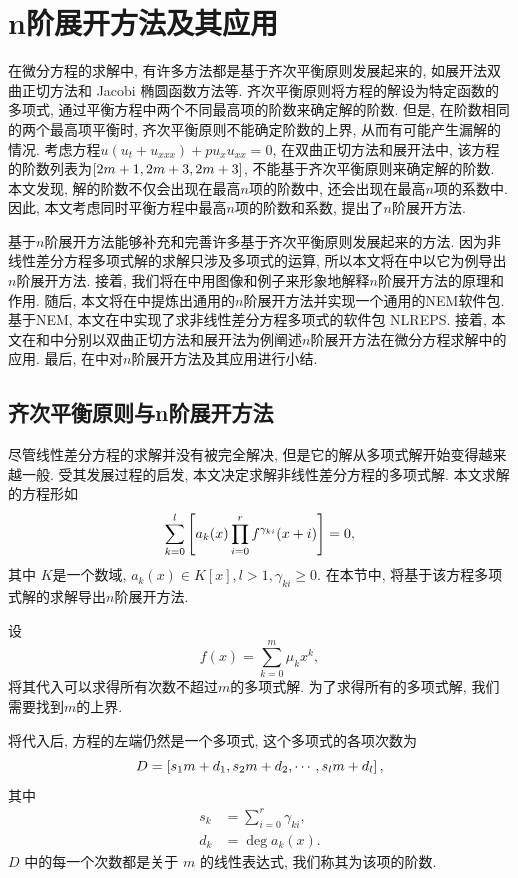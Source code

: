 \chapter{n阶展开方法及其应用}\label{ch04}
在微分方程的求解中, 有许多方法都是基于齐次平衡原则发展起来的, 如\Painleve{}展开法\D 双曲正切方法和 Jacobi 椭圆函数方法等. 齐次平衡原则将方程的解设为特定函数的多项式, 通过平衡方程中两个不同最高项的阶数来确定解的阶数. 但是, 在阶数相同的两个最高项平衡时, 齐次平衡原则不能确定阶数的上界, 从而有可能产生漏解的情况. 考虑方程$u(u_t+u_{xxx})+pu_x u_{xx}=0$, 在双曲正切方法和\Painleve{}展开法中, 该方程的阶数列表为$\left[2m+1,2m+3,2m+3\right]$, 不能基于齐次平衡原则来确定解的阶数. 本文发现, 解的阶数不仅会出现在最高$n$项的阶数中, 还会出现在最高$n$项的系数中. 因此, 本文考虑同时平衡方程中最高$n$项的阶数和系数, 提出了$n$阶展开方法. 

基于$n$阶展开方法能够补充和完善许多基于齐次平衡原则发展起来的方法. 因为非线性差分方程多项式解的求解只涉及多项式的运算, 所以本文将在中以它为例导出$n$阶展开方法. 接着, 我们将在中用图像和例子来形象地解释$n$阶展开方法的原理和作用. 随后, 本文将在中提炼出通用的$n$阶展开方法并实现一个通用的NEM软件包. 基于NEM, 本文在中实现了求非线性差分方程多项式的软件包 NLREPS. 接着, 本文在和中分别以双曲正切方法和\Painleve{}展开法为例阐述$n$阶展开方法在微分方程求解中的应用. 最后, 在中对$n$阶展开方法及其应用进行小结. 

\section{齐次平衡原则与n阶展开方法} \label{ch4sec1}
尽管线性差分方程的求解并没有被完全解决, 但是它的解从多项式解开始变得越来越一般. 受其发展过程的启发, 本文决定求解非线性差分方程的多项式解. 本文求解的方程形如
\begin{equation}
\sum_{k=0}^l{\left[a_k(x)\prod_{i=0}^r{f^{\gamma_{ki}}(x+i)}\right]}=0,
\label{eq}
\end{equation}
其中 $K$是一个数域, $a_k(x)\in K[x], l>1, \gamma_{ki}\ge 0$. 在本节中, 将基于该方程多项式解的求解导出$n$阶展开方法. 

设
\begin{equation}
f(x)=\sum_{k=0}^m{\mu_kx^k},
\label{fm1}
\end{equation}
将其代入可以求得所有次数不超过$m$的多项式解. 为了求得所有的多项式解, 我们需要找到$m$的上界.

将代入后, 方程的左端仍然是一个多项式, 这个多项式的各项次数为
\begin{equation}
D = \left[s_1 m+d_1,s_2 m+d_2,\cdots,s_l m+d_l\right],
\end{equation}
其中
\begin{equation}
\begin{aligned}
s_k&=\sum_{i=0}^r{\gamma_{ki}}, \\
d_k&=\deg a_k(x).
\end{aligned}
\label{eq-sd}
\end{equation}
$D$ 中的每一个次数都是关于 $m$ 的线性表达式, 我们称其为该项的阶数.

